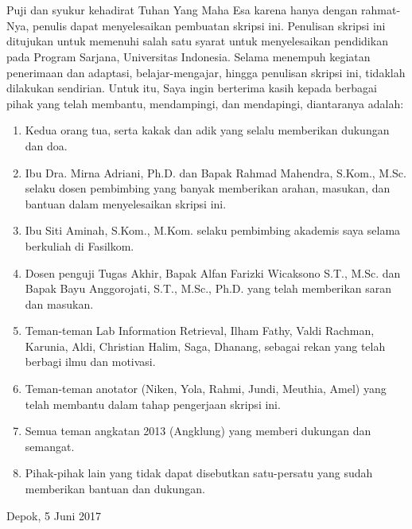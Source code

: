 \chapter*{\kataPengantar}
Puji dan syukur kehadirat Tuhan Yang Maha Esa karena hanya dengan rahmat-Nya, penulis dapat menyelesaikan pembuatan skripsi ini. Penulisan skripsi ini ditujukan untuk memenuhi salah satu syarat untuk menyelesaikan pendidikan pada Program Sarjana, Universitas Indonesia. Selama menempuh kegiatan penerimaan dan adaptasi, belajar-mengajar, hingga penulisan skripsi ini, tidaklah dilakukan sendirian. Untuk itu, Saya ingin berterima kasih kepada berbagai pihak yang telah membantu, mendampingi, dan mendapingi, diantaranya adalah:

\begin{enumerate}
  \item Kedua orang tua, serta kakak dan adik yang selalu memberikan dukungan dan doa.
  \item Ibu Dra. Mirna Adriani, Ph.D. dan Bapak Rahmad Mahendra, S.Kom., M.Sc. selaku dosen pembimbing yang banyak memberikan arahan, masukan, dan bantuan dalam menyelesaikan skripsi ini.
  \item Ibu Siti Aminah, S.Kom., M.Kom. selaku pembimbing akademis saya selama berkuliah di Fasilkom.
  \item Dosen penguji Tugas Akhir, Bapak Alfan Farizki Wicaksono S.T., M.Sc. dan Bapak Bayu Anggorojati, S.T., M.Sc., Ph.D. yang telah memberikan saran dan masukan.
  \item Teman-teman Lab Information Retrieval, Ilham Fathy, Valdi Rachman, Karunia, Aldi, Christian Halim, Saga, Dhanang, sebagai rekan yang telah berbagi ilmu dan motivasi.
  \item Teman-teman anotator (Niken, Yola, Rahmi, Jundi, Meuthia, Amel) yang telah membantu dalam tahap pengerjaan skripsi ini.
  \item Semua teman angkatan 2013 (Angklung) yang memberi dukungan dan semangat.
  \item Pihak-pihak lain yang tidak dapat disebutkan satu-persatu yang sudah memberikan bantuan dan dukungan.
\end{enumerate}

\vspace*{0.1cm}
\begin{flushright}
Depok, 5 Juni 2017\\[0.1cm]
\vspace*{1cm}
\penulis

\end{flushright}
